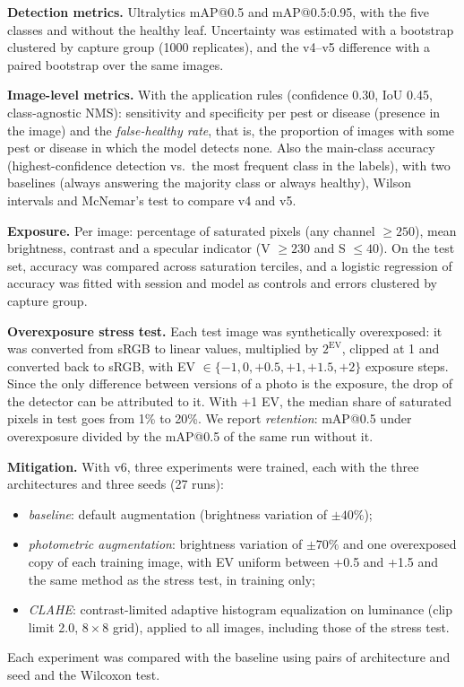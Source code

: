\documentclass[sensors,article,submit,pdftex,moreauthors]{Definitions/mdpi}
\begin{document}
\textbf{Detection metrics.} Ultralytics mAP@0.5 and mAP@0.5:0.95, with the five classes and without the healthy leaf. Uncertainty was estimated with a bootstrap clustered by capture group (1000 replicates), and the v4--v5 difference with a paired bootstrap over the same images.

\textbf{Image-level metrics.} With the application rules (confidence 0.30, IoU 0.45, class-agnostic NMS): sensitivity and specificity per pest or disease (presence in the image) and the \emph{false-healthy rate}, that is, the proportion of images with some pest or disease in which the model detects none. Also the main-class accuracy (highest-confidence detection vs.\ the most frequent class in the labels), with two baselines (always answering the majority class or always healthy), Wilson intervals and McNemar's test to compare v4 and v5.

\textbf{Exposure.} Per image: percentage of saturated pixels (any channel $\geq 250$), mean brightness, contrast and a specular indicator (V $\geq 230$ and S $\leq 40$). On the test set, accuracy was compared across saturation terciles, and a logistic regression of accuracy was fitted with session and model as controls and errors clustered by capture group.

\textbf{Overexposure stress test.} Each test image was synthetically overexposed: it was converted from sRGB to linear values, multiplied by $2^{\mathrm{EV}}$, clipped at 1 and converted back to sRGB, with EV $\in \{-1, 0, +0.5, +1, +1.5, +2\}$ exposure steps. Since the only difference between versions of a photo is the exposure, the drop of the detector can be attributed to it. With +1 EV, the median share of saturated pixels in test goes from 1\% to 20\%. We report \emph{retention}: mAP@0.5 under overexposure divided by the mAP@0.5 of the same run without it.

\textbf{Mitigation.} With v6, three experiments were trained, each with the three architectures and three seeds (27 runs):
\begin{itemize}[leftmargin=*,labelsep=4.9mm]
\item \emph{baseline}: default augmentation (brightness variation of $\pm 40\%$);
\item \emph{photometric augmentation}: brightness variation of $\pm 70\%$ and one overexposed copy of each training image, with EV uniform between +0.5 and +1.5 and the same method as the stress test, in training only;
\item \emph{CLAHE}: contrast-limited adaptive histogram equalization on luminance (clip limit 2.0, $8\times8$ grid), applied to all images, including those of the stress test.
\end{itemize}
Each experiment was compared with the baseline using pairs of architecture and seed and the Wilcoxon test.
\end{document}
